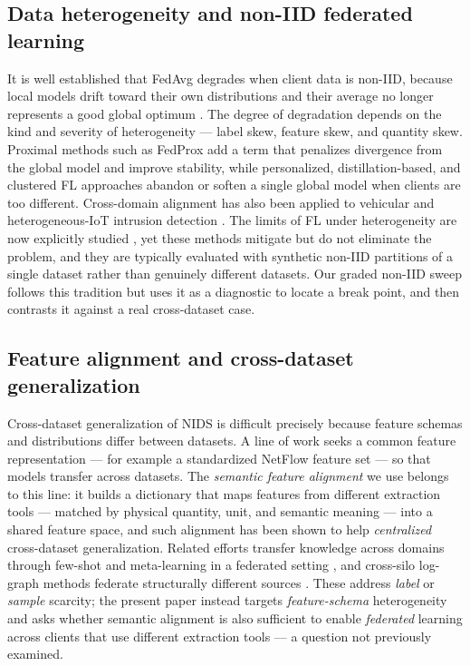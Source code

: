 \documentclass[11pt,a4paper]{article}
\begin{document}
\subsection{Data heterogeneity and non-IID federated learning}
It is well established that FedAvg degrades when client data is non-IID, because
local models drift toward their own distributions and their average no longer
represents a good global optimum \cite{ref-limits}. The degree of degradation
depends on the kind and severity of heterogeneity --- label skew, feature skew,
and quantity skew. Proximal methods such as FedProx \cite{fedprox} add a term that
penalizes divergence from the global model and improve stability, while
personalized, distillation-based, and clustered FL approaches
\cite{ref-personalized,benkaddour,ali-mist} abandon or soften a single global
model when clients are too different. Cross-domain alignment has also been applied
to vehicular and heterogeneous-IoT intrusion detection
\cite{khalid-fedcross,ks-ensemble}. The limits of FL under heterogeneity are now
explicitly studied \cite{ref-limits}, yet these methods mitigate but do not
eliminate the problem, and they are typically evaluated with synthetic non-IID
partitions of a single dataset rather than genuinely different datasets. Our
graded non-IID sweep follows this tradition but uses it as a diagnostic to locate
a break point, and then contrasts it against a real cross-dataset case.

\subsection{Feature alignment and cross-dataset generalization}
Cross-dataset generalization of NIDS is difficult precisely because feature
schemas and distributions differ between datasets. A line of work seeks a common
feature representation --- for example a standardized NetFlow feature set
\cite{sarhan} --- so
that models transfer across datasets. The \emph{semantic feature alignment} we use
belongs to this line: it builds a dictionary that maps features from different
extraction tools --- matched by physical quantity, unit, and semantic meaning ---
into a shared feature space, and such alignment has been shown to help
\emph{centralized} cross-dataset
generalization. Related efforts transfer knowledge across domains through
few-shot and meta-learning in a federated setting
\cite{hu-fewshot,mao-fecograph,yin-fedpkt,zhang-transfer,ceviz-fewshot}, and
cross-silo log-graph methods federate structurally different sources
\cite{xu-entente}. These address \emph{label} or \emph{sample} scarcity; the
present paper instead targets \emph{feature-schema} heterogeneity and asks whether
semantic alignment is also sufficient to enable \emph{federated} learning across
clients that use different extraction tools --- a question not previously examined.
\end{document}
